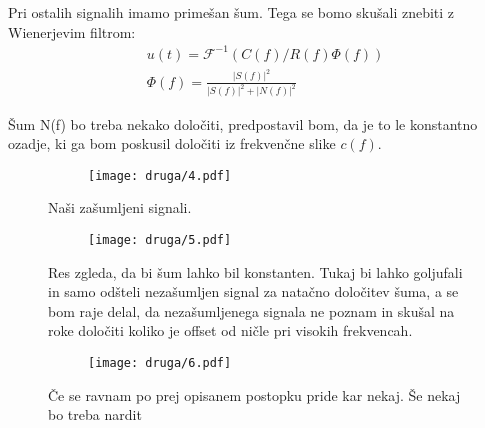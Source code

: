 \documentclass{article}
\begin{document}
Pri ostalih signalih imamo primešan šum. Tega se bomo skušali znebiti z Wienerjevim filtrom:
\begin{align*}
&u(t) = \mathscr{F}^{-1} \left(C(f)/R(f) \Phi(f) \right) \\
&\Phi(f) = \frac{|S(f)|^2}{|S(f)|^2+|N(f)|^2}
\end{align*}

Šum N(f) bo treba nekako določiti, predpostavil bom, da je to le konstantno ozadje, ki ga bom poskusil določiti iz frekvenčne slike $c(f)$.

\begin{figure}[H]
\centering
\begin{subfigure}{.6\textwidth}
\texttt{[image: druga/4.pdf]}
\end{subfigure}
\caption*{Naši zašumljeni signali.}
\end{figure}

\begin{figure}[H]
\centering
\begin{subfigure}{.6\textwidth}
\texttt{[image: druga/5.pdf]}
\end{subfigure}
\caption*{Res zgleda, da bi šum lahko bil konstanten. Tukaj bi lahko goljufali in samo odšteli nezašumljen signal za natačno določitev šuma, a se bom raje delal, da nezašumljenega signala ne poznam in skušal na roke določiti koliko je offset od ničle pri visokih frekvencah.}
\end{figure}

\begin{figure}[H]
\centering
\begin{subfigure}{.6\textwidth}
\texttt{[image: druga/6.pdf]}
\end{subfigure}
\caption*{Če se ravnam po prej opisanem postopku pride kar nekaj. Še nekaj bo treba nardit}
\end{figure}
\end{document}
